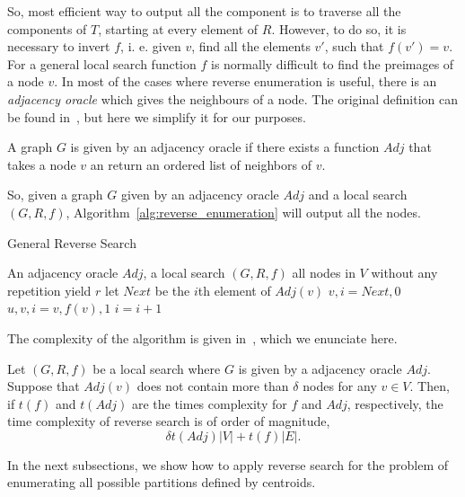 \documentclass{article}
\begin{document}
So, most efficient way to output all the component is to traverse all
the components of $T$, starting at every element of $R$. 
However, to do so, it is necessary to invert $f$, i. e. 
given $v$, find all the elements $v'$, such that $f(v')=v$. For a
general local search function $f$ is normally difficult to find 
the preimages of a node $v$. In most of the cases where reverse
enumeration is useful, there is an 
\textit{adjacency oracle} which gives the neighbours of a node. The
original definition can be found in~\cite{AvisFukuda}, but here we
simplify it for our purposes. 
\begin{definition}
  A graph $G$ is given by an  adjacency oracle if there exists  a
  function $Adj$ that takes a node $v$ an return an ordered list of
  neighbors of $v$.
\end{definition}
So, given a graph $G$ given by an adjacency oracle $Adj$ and a local
search $(G,R,f)$, Algorithm~\ref{alg:reverse_enumeration} will output
all the nodes. 
\begin{algorithm}
  \caption{General Reverse Search}
  \label{alg:reverse_enumeration}
  \begin{algorithmic}
    \REQUIRE An adjacency oracle $Adj$, a local search $(G,R,f)$
    \ENSURE all nodes in $V$ without any repetition
    \STATE yield $r$
    \STATE let $Next$ be the $i$th element of $Adj(v)$
    \STATE $v, i = Next, 0$
    \ELSE
    \ENDIF
    \ENDWHILE
    \ELSE
    \STATE $u, v, i  = v, f(v), 1$
    \STATE $i = i +1$
    \ENDWHILE
    \ENDIF
    \ENDWHILE
    \ENDFOR
  \end{algorithmic}
\end{algorithm}
The complexity of the algorithm is given in~\cite[Theorem
2.2]{AvisFukuda}, which we enunciate here.
\begin{theorem}
  Let   $(G, R, f)$ be a local search where  $G$ is
  given by a adjacency oracle $Adj$. Suppose that  $Adj(v)$ does not
  contain more than $\delta$ nodes for any $v\in V$. Then, if $t(f)$
  and $t(Adj)$ are the times complexity for $f$ and $Adj$,
  respectively, the time complexity of reverse search is of order of
  magnitude, 
  \begin{equation*}
    \delta t(Adj)|V| + t(f)|E|.
  \end{equation*}
\end{theorem}
In the next subsections, we show how to apply reverse search for the
problem of enumerating all possible partitions defined by centroids.
\end{document}
